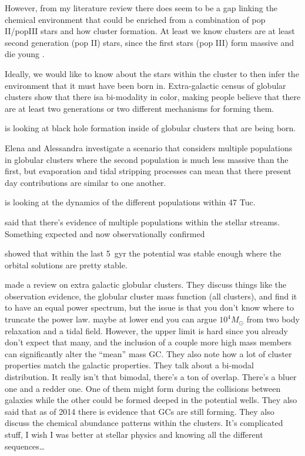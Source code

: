    However, from my literature review there does seem to be a gap linking the chemical environment that could be enriched from a combination of pop II/popIII stars and how cluster formation. At least we know clusters are at least second generation (pop II) stars, since the first stars (pop III) form massive and die young \citep{2002ApJ...571...30S}.

    Ideally, we would like to know about the stars within the cluster to then infer the environment that it must have been born in. Extra-galactic census of globular clusters show that there isa bi-modality in color, making people believe that there are at least two generations or two different mechanisms for forming them. 

    \citet{2025arXiv250507491V} is looking at black hole formation inside of globular clusters that are being born. 

    \citet{2024A&A...681A..45L} Elena and Alessandra investigate a scenario that considers multiple populations in globular clusters where the second population is much less massive than the first, but evaporation and tidal stripping processes can mean that there present day contributions are similar to one another. 

    \citet{2025MNRAS.537.2342C} is looking at the dynamics of the different populations within 47 Tuc.

    \citet{2024MNRAS.529.2413U} said that there's evidence of multiple populations within the stellar streams. Something expected and now observationally confirmed 

    \citet{2023A&A...673A.152I} showed that within the last 5~gyr the potential was stable enough where the orbital solutions are pretty stable. 
    
    \citet{2006ARA&A..44..193B} made a review on extra galactic globular clusters. They discuss things like the observation evidence, the globular cluster mass function (all clusters), and find it to have an equal power spectrum, but the issue is that you don't know where to truncate the power law. maybe at lower end you can argue $10^4 M_\odot$ from two body relaxation and a tidal field. However, the upper limit is hard since you already don't expect that many, and the inclusion of a couple more high mass members can significantly alter the ``mean'' mass GC. They also note how a lot of cluster properties match the galactic properties. They talk about a bi-modal distribution. It really isn't that bimodal, there's a ton of overlap. There's a bluer one and a redder one. One of them might form during the collisions between galaxies while the other could be formed deeped in the potential wells. They also said that as of 2014 there is evidence that GCs are still forming. They also discuss the chemical abundance patterns within the clusters. It's complicated stuff, I wish I was better at stellar physics and knowing all the different sequences\dots
    
